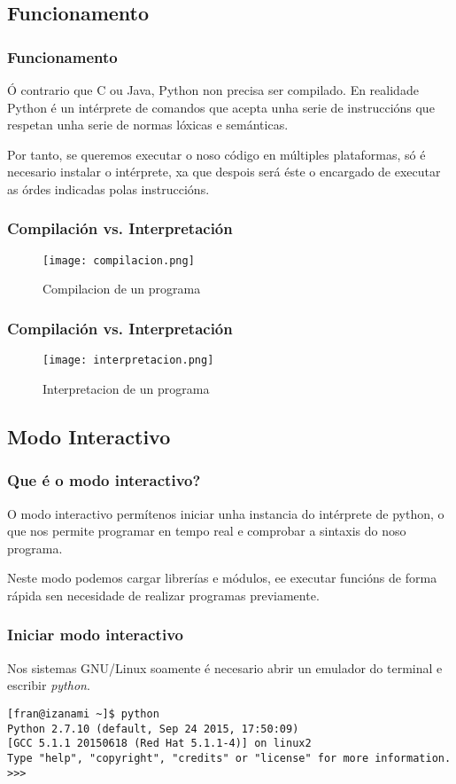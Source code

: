 \subsection{Funcionamento}
\label{subsec:funcionamento}

\begin{frame}
  \frametitle{Funcionamento}
  Ó contrario que C ou Java, Python non precisa ser compilado. En realidade
  Python é un intérprete de comandos que acepta unha serie de instruccións que
  respetan unha serie de normas lóxicas e semánticas.

  Por tanto, se queremos executar o noso código en múltiples plataformas, só é
  necesario instalar o intérprete, xa que despois será éste o encargado de
  executar as órdes indicadas polas instruccións.
\end{frame}

\begin{frame}
  \frametitle{Compilación vs. Interpretación}
  \begin{figure}[ht]
    \centering
    \texttt{[image: compilacion.png]}
    \caption{Compilacion de un programa}
  \end{figure}
\end{frame}

\begin{frame}
  \frametitle{Compilación vs. Interpretación}
  \begin{figure}[ht]
    \centering
    \texttt{[image: interpretacion.png]}
    \caption{Interpretacion de un programa}
  \end{figure}
\end{frame}

\subsection{Modo Interactivo}
\label{subsec:modo interactivo}

\begin{frame}
  \frametitle{Que é o modo interactivo?}
  O modo interactivo permítenos iniciar unha instancia do intérprete de python,
  o que nos permite programar en tempo real e comprobar a sintaxis do noso
  programa.
  
  Neste modo podemos cargar librerías e módulos, ee executar funcións de forma
  rápida sen necesidade de realizar programas previamente.
\end{frame}

\begin{frame}[fragile]
  \frametitle{Iniciar modo interactivo}
  Nos sistemas GNU/Linux soamente é necesario abrir un emulador do terminal e
  escribir \emph{python}.
  \small
\begin{verbatim}
[fran@izanami ~]$ python
Python 2.7.10 (default, Sep 24 2015, 17:50:09) 
[GCC 5.1.1 20150618 (Red Hat 5.1.1-4)] on linux2
Type "help", "copyright", "credits" or "license" for more information.
>>> 
\end{verbatim}
  \normalsize
\end{frame}

